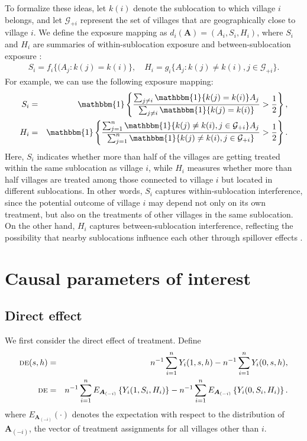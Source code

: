 \documentclass{article}
\newcommand{\bA}{\boldsymbol{A}}
\newcommand{\cG}{\mathcal{G}}
\newcommand{\sumi}{\sum_{i=1}^n}
\newcommand{\sumj}{\sum_{j=1}^n}
\newcommand{\de}{\textsc{de}}
\newcommand{\indicator}{\mathbbm{1}}
\begin{document}
To formalize these ideas, let $k(i)$ denote the sublocation to which village $i$ belongs, and let $\cG_{+i}$ represent the set of villages that are geographically close to village $i$. We define the exposure mapping as $d_i(\bA) = (A_{i}, S_{i}, H_{i})$, where $S_i$ and $H_i$ are summaries of within-sublocation exposure and between-sublocation exposure \citep{aronow2017estimating}:
\begin{eqnarray*}
    S_{i} = f_i\{(A_{j}: k(j)=k(i)\}, \quad 
    H_{i} = g_i\{A_j: k(j)\neq k(i), j\in\cG_{+i}\}. 
\end{eqnarray*}
For example, we can use the following exposure mapping:  
\begin{eqnarray*}
    S_{i} &=& \indicator\left\{\frac{\sum_{j\neq i}\indicator\{k(j)=k(i)\} A_{j}}{\sum_{j\neq i}\indicator\{k(j)=k(i)\}} > \frac{1}{2}\right\},  \\
    H_{i} &=& \indicator \left\{\frac{\sumj \indicator\{k(j)\neq k(i), j\in\cG_{+i}\}A_{j}}{\sumj \indicator\{k(j)\neq k(i), j\in\cG_{+i}\}} > \frac{1}{2}\right\}.
\end{eqnarray*}
Here, $S_{i}$ indicates whether more than half of the villages are getting treated within the same sublocation as village $i$, while $H_{i}$ measures whether more than half villages are treated among those connected to village $i$ but located in different sublocations. In other words, $S_{i}$ captures within-sublocation interference, since the potential outcome of village $i$ may depend not only on its own treatment, but also on the treatments of other villages in the same sublocation. On the other hand, $H_{i}$ captures between-sublocation interference, reflecting the possibility that nearby sublocations influence each other through spillover effects \citep{egger2022general}. 

\section{Causal parameters of interest}
\label{sec::parameters}

\subsection{Direct effect}
We first consider the direct effect of treatment. Define
\begin{eqnarray*}
    \de(s,h) &=& n^{-1}\sumi Y_{i}(1,s,h) - n^{-1}\sumi Y_{i}(0,s,h), \\
    \de &=& n^{-1}\sumi E_{\bA_{(-i)}}\left\{Y_{i}(1,S_{i},H_{i})\right\} - n^{-1}\sumi E_{\bA_{(-i)}}\left\{Y_{i}(0,S_{i},H_{i})\right\}.
\end{eqnarray*}
where $E_{\bA_{(-i)}}(\cdot)$ denotes the expectation with respect to the distribution of $\bA_{(-i)}$, the vector of treatment assignments for all villages other than $i$. 
\end{document}
